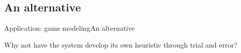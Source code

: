 \subsection{An alternative}
\begin{frame}{Application: game modeling}{An alternative}

\huge{Why not have the system develop its own heuristic through trial and error?}

\end{frame}